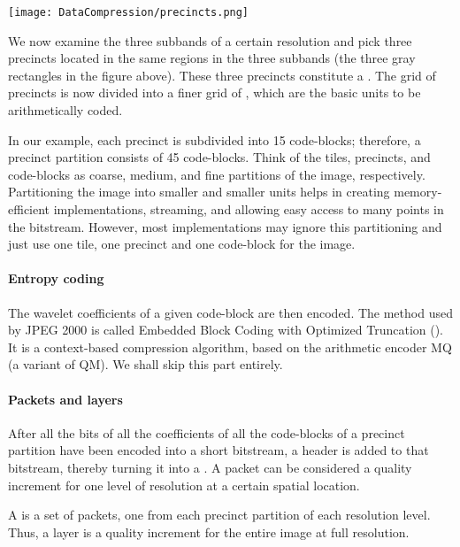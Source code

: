 \documentclass[a4paper, 11pt, openany]{book}
\begin{document}
\begin{center}
    \texttt{[image: DataCompression/precincts.png]}
\end{center}

We now examine the three subbands of a certain resolution and pick three precincts located in the same regions in the three subbands (the three gray rectangles in the figure above). These three precincts constitute a . The grid of precincts is now divided into a finer grid of , which are the basic units to be arithmetically coded.

In our example, each precinct is subdivided into 15 code-blocks; therefore, a precinct partition consists of 45 code-blocks. Think of the tiles, precincts, and code-blocks as coarse, medium, and fine partitions of the image, respectively. Partitioning the image into smaller and smaller units helps in creating memory-efficient implementations, streaming, and allowing easy access to many points in the bitstream.  However, most implementations may ignore this partitioning and just use one tile, one precinct and one code-block for the image.

\paragraph{Entropy coding}
The wavelet coefficients of a given code-block are then encoded. The method used by JPEG 2000 is called Embedded Block Coding with Optimized Truncation (). It is a context-based compression algorithm, based on the arithmetic encoder MQ (a variant of QM). We shall skip this part entirely.



\paragraph{Packets and layers}

After all the bits of all the coefficients of all the code-blocks of a precinct
partition have been encoded into a short bitstream, a header is added to that bitstream, thereby turning it into a . A packet can be considered a
quality increment for one level of resolution at a certain spatial location.

A  is a set of packets, one from each precinct partition of each resolution level. Thus, a layer is a quality increment for the entire
image at full resolution.
\end{document}
